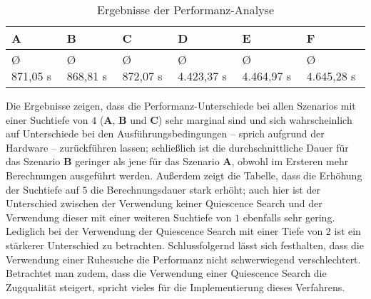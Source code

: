 \begin{table}[H]
	\centering
	\begin{tabular}{|l|l|l|l|l|l|}
		\hline
		\textbf{A} & \textbf{B} & \textbf{C} & \textbf{D}   & \textbf{E}   & \textbf{F}   \\ \hline
		Ø 871,05 s & Ø 868,81 s & Ø 872,07 s & Ø 4.423,37 s & Ø 4.464,97 s & Ø 4.645,28 s \\ \hline
	\end{tabular}
	\caption{Ergebnisse der Performanz-Analyse}
	\label{tab:performance}
\end{table}

Die Ergebnisse zeigen, dass die Performanz-Unterschiede bei allen Szenarios mit einer Suchtiefe von $4$ (\textbf{A}, \textbf{B} und \textbf{C}) sehr marginal sind und sich wahrscheinlich auf Unterschiede bei den Ausführungsbedingungen -- sprich aufgrund der Hardware -- zurückführen lassen; schließlich ist die durchschnittliche Dauer für das Szenario \textbf{B} geringer als jene für das Szenario \textbf{A}, obwohl im Ersteren mehr Berechnungen ausgeführt werden. Außerdem zeigt die Tabelle, dass die Erhöhung der Suchtiefe auf $5$ die Berechnungsdauer stark erhöht; auch hier ist der Unterschied zwischen der Verwendung keiner Quiescence Search und der Verwendung dieser mit einer weiteren Suchtiefe von $1$ ebenfalls sehr gering. Lediglich bei der Verwendung der Quiescence Search mit einer Tiefe von $2$ ist ein stärkerer Unterschied zu betrachten. Schlussfolgernd lässt sich festhalten, dass die Verwendung einer Ruhesuche die Performanz nicht schwerwiegend verschlechtert. Betrachtet man zudem, dass die Verwendung einer Quiescence Search die Zugqualität steigert, spricht vieles für die Implementierung dieses Verfahrens.